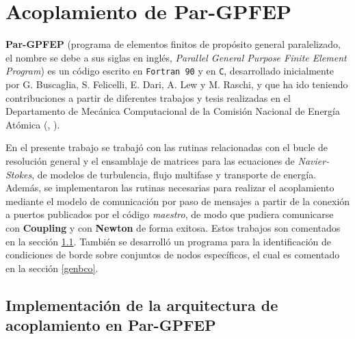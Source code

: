\chapter{Acoplamiento de \textbf{Par-GPFEP}}
\label{C:pargpfep}

\textbf{Par-GPFEP} (programa de elementos finitos de propósito general paralelizado, el nombre se debe a sus siglas
en inglés, \textit{Parallel General Purpose Finite Element Program})
es un código escrito en \texttt{Fortran 90} y en \texttt{C},
desarrollado inicialmente por G. Buscaglia, S. Felicelli, E. Dari, A. Lew y M. Raschi,
y que ha ido teniendo contribuciones a partir de diferentes trabajos y tesis realizadas
en el Departamento de Mecánica Computacional de la Comisión Nacional de Energía Atómica (\cite{gpfep}, \cite{pargpfep}).

En el presente trabajo se trabajó con las rutinas relacionadas con el bucle de resolución general
y el ensamblaje de matrices para las ecuaciones de \textit{Navier-Stokes}, de modelos de turbulencia, flujo multifase y transporte de energía.
Además, se implementaron las rutinas necesarias para realizar el acoplamiento mediante el modelo de comunicación por paso de mensajes
a partir de la conexión a puertos publicados por el código \textit{maestro}, de modo que pudiera comunicarse con \textbf{Coupling} y con \textbf{Newton} de forma exitosa.
Estos trabajos son comentados en la sección \ref{pargpfep-impl}.
También se desarrolló un programa para la identificación de condiciones de borde sobre conjuntos de nodos específicos, el cual es comentado en la sección \ref{genbco}.

\section{Implementación de la arquitectura de acoplamiento en \textbf{Par-GPFEP}}
\label{pargpfep-impl}

